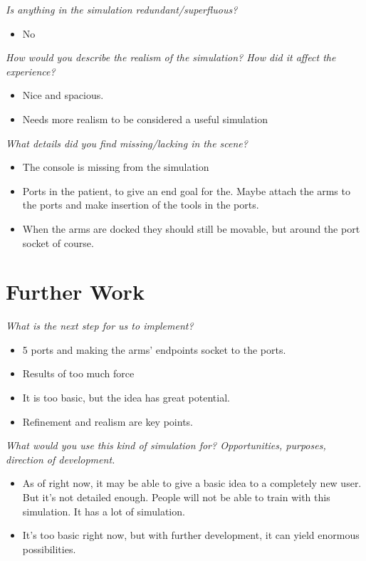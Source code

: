 \textit{Is anything in the simulation redundant/superfluous?}
\begin{itemize}
	\item No
\end{itemize}

\textit{How would you describe the realism of the simulation? How did it affect the experience?}
\begin{itemize}
	\item Nice and spacious.
	\item Needs more realism to be considered a useful simulation
\end{itemize}

\textit{What details did you find missing/lacking in the scene?}
\begin{itemize}
	\item The console is missing from the simulation
	\item Ports in the patient, to give an end goal for the. Maybe attach the arms to the ports and make insertion of the tools in the ports.
	\item When the arms are docked they should still be movable, but around the port socket of course.
\end{itemize}

\section*{Further Work}
\textit{What is the next step for us to implement?}
\begin{itemize}
	\item 5 ports and making the arms’ endpoints socket to the ports. 
	\item Results of too much force
	\item It is too basic, but the idea has great potential.
	\item Refinement and realism are key points.
\end{itemize}

\textit{What would you use this kind of simulation for? Opportunities, purposes, direction of development.}
\begin{itemize}
	\item As of right now, it may be able to give a basic idea to a completely new user. But it’s not detailed enough. People will not be able to train with this simulation. It has a lot of simulation.
	\item It’s too basic right now, but with further development, it can yield enormous possibilities. 
\end{itemize}

